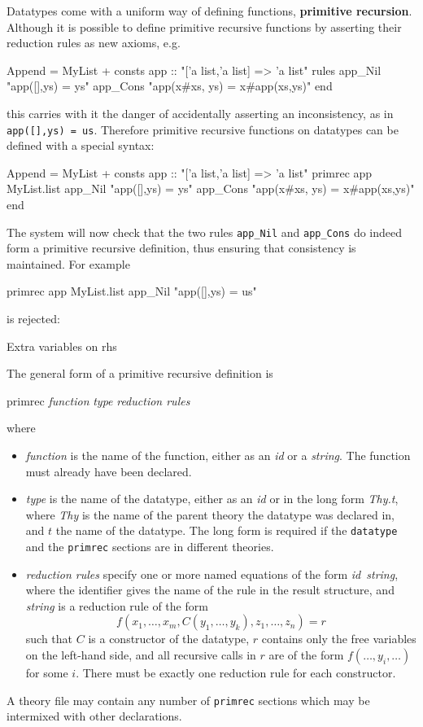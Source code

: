 Datatypes come with a uniform way of defining functions, {\bf primitive
  recursion}. Although it is possible to define primitive recursive functions
by asserting their reduction rules as new axioms, e.g.\
\begin{ttbox}
Append = MyList +
consts app :: "['a list,'a list] => 'a list"
rules 
   app_Nil   "app([],ys) = ys"
   app_Cons  "app(x#xs, ys) = x#app(xs,ys)"
end
\end{ttbox}
this carries with it the danger of accidentally asserting an inconsistency,
as in \verb$app([],ys) = us$. Therefore primitive recursive functions on
datatypes can be defined with a special syntax:
\begin{ttbox}
Append = MyList +
consts app :: "['a list,'a list] => 'a list"
primrec app MyList.list
   app_Nil   "app([],ys) = ys"
   app_Cons  "app(x#xs, ys) = x#app(xs,ys)"
end
\end{ttbox}
The system will now check that the two rules \verb$app_Nil$ and
\verb$app_Cons$ do indeed form a primitive recursive definition, thus
ensuring that consistency is maintained. For example
\begin{ttbox}
primrec app MyList.list
    app_Nil   "app([],ys) = us"
\end{ttbox}
is rejected:
\begin{ttbox}
Extra variables on rhs
\end{ttbox}
\bigskip

The general form of a primitive recursive definition is
\begin{ttbox}
primrec {\it function} {\it type}
    {\it reduction rules}
\end{ttbox}
where
\begin{itemize}
\item {\it function} is the name of the function, either as an {\it id} or a
  {\it string}. The function must already have been declared.
\item {\it type} is the name of the datatype, either as an {\it id} or in the
  long form {\it Thy.t}, where {\it Thy} is the name of the parent theory the
  datatype was declared in, and $t$ the name of the datatype. The long form
  is required if the {\tt datatype} and the {\tt primrec} sections are in
  different theories.
\item {\it reduction rules} specify one or more named equations of the form
  {\it id\/}~{\it string}, where the identifier gives the name of the rule in
  the result structure, and {\it string} is a reduction rule of the form \[
  f(x_1,\dots,x_m,C(y_1,\dots,y_k),z_1,\dots,z_n) = r \] such that $C$ is a
  constructor of the datatype, $r$ contains only the free variables on the
  left-hand side, and all recursive calls in $r$ are of the form
  $f(\dots,y_i,\dots)$ for some $i$. There must be exactly one reduction
  rule for each constructor.
\end{itemize}
A theory file may contain any number of {\tt primrec} sections which may be
intermixed with other declarations.

